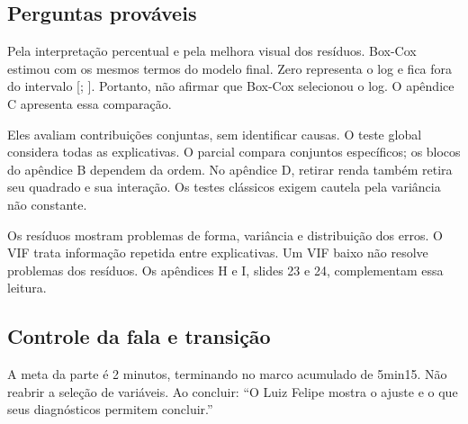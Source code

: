 \subsection{Perguntas prováveis}
\begin{description}[leftmargin=0pt]
\item[Por que usar logaritmo?] Pela interpretação percentual e pela melhora visual dos resíduos. Box-Cox estimou \nLambdaFinal{} com os mesmos termos do modelo final. Zero representa o log e fica fora do intervalo [\nLambdaFinalInf; \nLambdaFinalSup]. Portanto, não afirmar que Box-Cox selecionou o log. O apêndice C apresenta essa comparação.
\item[O que os testes $F$ demonstram?] Eles avaliam contribuições conjuntas, sem identificar causas. O teste global considera todas as explicativas. O parcial compara conjuntos específicos; os blocos do apêndice B dependem da ordem. No apêndice D, retirar renda também retira seu quadrado e sua interação. Os testes clássicos exigem cautela pela variância não constante.
\item[Por que avaliar resíduos antes do VIF?] Os resíduos mostram problemas de forma, variância e distribuição dos erros. O VIF trata informação repetida entre explicativas. Um VIF baixo não resolve problemas dos resíduos. Os apêndices H e I, slides 23 e 24, complementam essa leitura.
\end{description}
\subsection{Controle da fala e transição}
A meta da parte é 2 minutos, terminando no marco acumulado de 5min15.
Não reabrir a seleção de variáveis. Ao concluir: ``O Luiz Felipe mostra o ajuste e o que seus diagnósticos permitem concluir.''
